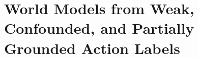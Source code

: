 %
%
%

\makeatletter
{}
\makeatother

\section{World Models from Weak, Confounded, and Partially Grounded Action Labels}
\label{sec:wm}

